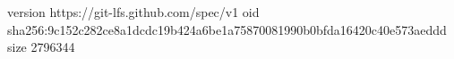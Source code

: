 version https://git-lfs.github.com/spec/v1
oid sha256:9c152c282ce8a1dcdc19b424a6be1a75870081990b0bfda16420c40e573aeddd
size 2796344
